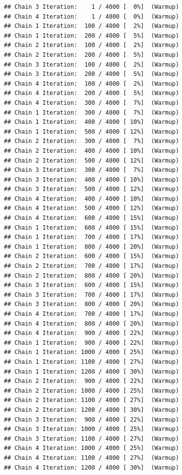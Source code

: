 \documentclass[
]{article}
\begin{document}
\begin{verbatim}
## Chain 3 Iteration:    1 / 4000 [  0%]  (Warmup) 
## Chain 4 Iteration:    1 / 4000 [  0%]  (Warmup) 
## Chain 1 Iteration:  100 / 4000 [  2%]  (Warmup) 
## Chain 1 Iteration:  200 / 4000 [  5%]  (Warmup) 
## Chain 2 Iteration:  100 / 4000 [  2%]  (Warmup) 
## Chain 2 Iteration:  200 / 4000 [  5%]  (Warmup) 
## Chain 3 Iteration:  100 / 4000 [  2%]  (Warmup) 
## Chain 3 Iteration:  200 / 4000 [  5%]  (Warmup) 
## Chain 4 Iteration:  100 / 4000 [  2%]  (Warmup) 
## Chain 4 Iteration:  200 / 4000 [  5%]  (Warmup) 
## Chain 4 Iteration:  300 / 4000 [  7%]  (Warmup) 
## Chain 1 Iteration:  300 / 4000 [  7%]  (Warmup) 
## Chain 1 Iteration:  400 / 4000 [ 10%]  (Warmup) 
## Chain 1 Iteration:  500 / 4000 [ 12%]  (Warmup) 
## Chain 2 Iteration:  300 / 4000 [  7%]  (Warmup) 
## Chain 2 Iteration:  400 / 4000 [ 10%]  (Warmup) 
## Chain 2 Iteration:  500 / 4000 [ 12%]  (Warmup) 
## Chain 3 Iteration:  300 / 4000 [  7%]  (Warmup) 
## Chain 3 Iteration:  400 / 4000 [ 10%]  (Warmup) 
## Chain 3 Iteration:  500 / 4000 [ 12%]  (Warmup) 
## Chain 4 Iteration:  400 / 4000 [ 10%]  (Warmup) 
## Chain 4 Iteration:  500 / 4000 [ 12%]  (Warmup) 
## Chain 4 Iteration:  600 / 4000 [ 15%]  (Warmup) 
## Chain 1 Iteration:  600 / 4000 [ 15%]  (Warmup) 
## Chain 1 Iteration:  700 / 4000 [ 17%]  (Warmup) 
## Chain 1 Iteration:  800 / 4000 [ 20%]  (Warmup) 
## Chain 2 Iteration:  600 / 4000 [ 15%]  (Warmup) 
## Chain 2 Iteration:  700 / 4000 [ 17%]  (Warmup) 
## Chain 2 Iteration:  800 / 4000 [ 20%]  (Warmup) 
## Chain 3 Iteration:  600 / 4000 [ 15%]  (Warmup) 
## Chain 3 Iteration:  700 / 4000 [ 17%]  (Warmup) 
## Chain 3 Iteration:  800 / 4000 [ 20%]  (Warmup) 
## Chain 4 Iteration:  700 / 4000 [ 17%]  (Warmup) 
## Chain 4 Iteration:  800 / 4000 [ 20%]  (Warmup) 
## Chain 4 Iteration:  900 / 4000 [ 22%]  (Warmup) 
## Chain 1 Iteration:  900 / 4000 [ 22%]  (Warmup) 
## Chain 1 Iteration: 1000 / 4000 [ 25%]  (Warmup) 
## Chain 1 Iteration: 1100 / 4000 [ 27%]  (Warmup) 
## Chain 1 Iteration: 1200 / 4000 [ 30%]  (Warmup) 
## Chain 2 Iteration:  900 / 4000 [ 22%]  (Warmup) 
## Chain 2 Iteration: 1000 / 4000 [ 25%]  (Warmup) 
## Chain 2 Iteration: 1100 / 4000 [ 27%]  (Warmup) 
## Chain 2 Iteration: 1200 / 4000 [ 30%]  (Warmup) 
## Chain 3 Iteration:  900 / 4000 [ 22%]  (Warmup) 
## Chain 3 Iteration: 1000 / 4000 [ 25%]  (Warmup) 
## Chain 3 Iteration: 1100 / 4000 [ 27%]  (Warmup) 
## Chain 4 Iteration: 1000 / 4000 [ 25%]  (Warmup) 
## Chain 4 Iteration: 1100 / 4000 [ 27%]  (Warmup) 
## Chain 4 Iteration: 1200 / 4000 [ 30%]  (Warmup) 

\end{verbatim}
\end{document}
